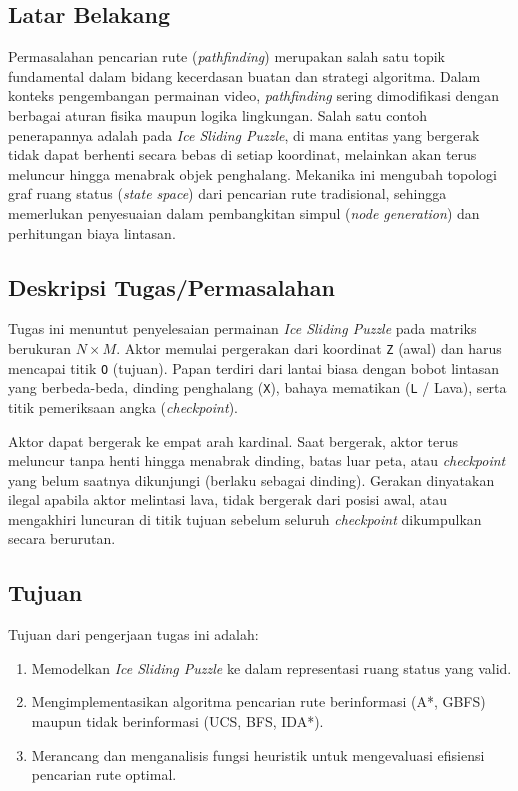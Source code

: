 \documentclass[11pt,a4paper]{article}
\begin{document}
\subsection{Latar Belakang}
Permasalahan pencarian rute (\textit{pathfinding}) merupakan salah satu topik fundamental dalam bidang kecerdasan buatan dan strategi algoritma. Dalam konteks pengembangan permainan video, \textit{pathfinding} sering dimodifikasi dengan berbagai aturan fisika maupun logika lingkungan. Salah satu contoh penerapannya adalah pada \textit{Ice Sliding Puzzle}, di mana entitas yang bergerak tidak dapat berhenti secara bebas di setiap koordinat, melainkan akan terus meluncur hingga menabrak objek penghalang. Mekanika ini mengubah topologi graf ruang status (\textit{state space}) dari pencarian rute tradisional, sehingga memerlukan penyesuaian dalam pembangkitan simpul (\textit{node generation}) dan perhitungan biaya lintasan. 

\subsection{Deskripsi Tugas/Permasalahan}
Tugas ini menuntut penyelesaian permainan \textit{Ice Sliding Puzzle} pada matriks berukuran $N \times M$. Aktor memulai pergerakan dari koordinat \texttt{Z} (awal) dan harus mencapai titik \texttt{O} (tujuan). Papan terdiri dari lantai biasa dengan bobot lintasan yang berbeda-beda, dinding penghalang (\texttt{X}), bahaya mematikan (\texttt{L} / Lava), serta titik pemeriksaan angka (\textit{checkpoint}).

Aktor dapat bergerak ke empat arah kardinal. Saat bergerak, aktor terus meluncur tanpa henti hingga menabrak dinding, batas luar peta, atau \textit{checkpoint} yang belum saatnya dikunjungi (berlaku sebagai dinding). Gerakan dinyatakan ilegal apabila aktor melintasi lava, tidak bergerak dari posisi awal, atau mengakhiri luncuran di titik tujuan sebelum seluruh \textit{checkpoint} dikumpulkan secara berurutan.

\subsection{Tujuan}
Tujuan dari pengerjaan tugas ini adalah:
\begin{enumerate}[noitemsep]
    \item Memodelkan \textit{Ice Sliding Puzzle} ke dalam representasi ruang status yang valid.
    \item Mengimplementasikan algoritma pencarian rute berinformasi (A*, GBFS) maupun tidak berinformasi (UCS, BFS, IDA*).
    \item Merancang dan menganalisis fungsi heuristik untuk mengevaluasi efisiensi pencarian rute optimal.
\end{enumerate}
\end{document}
